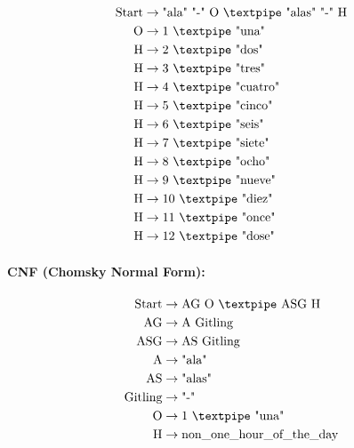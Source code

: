 \begin{equation*}
    \begin{aligned}
        \text{Start}   & \rightarrow \text{"ala" "-" O {\textpipe} "alas" "-" H}   \\
        \text{O} & \rightarrow \text{1 {\textpipe} "una"}   \\
        \text{H} & \rightarrow \text{2 {\textpipe} "dos"} \\
        \text{H} & \rightarrow \text{3 {\textpipe} "tres"} \\
        \text{H} & \rightarrow \text{4 {\textpipe} "cuatro"} \\
        \text{H} & \rightarrow \text{5 {\textpipe} "cinco"} \\
        \text{H} & \rightarrow \text{6 {\textpipe} "seis"} \\
        \text{H} & \rightarrow \text{7 {\textpipe} "siete"} \\
        \text{H} & \rightarrow \text{8 {\textpipe} "ocho"} \\
        \text{H} & \rightarrow \text{9 {\textpipe} "nueve"} \\
        \text{H} & \rightarrow \text{10 {\textpipe} "diez"} \\
        \text{H} & \rightarrow \text{11 {\textpipe} "once"} \\
        \text{H} & \rightarrow \text{12 {\textpipe} "dose"} \\
    \end{aligned}
\end{equation*}

\paragraph{CNF (Chomsky Normal Form):}

\begin{equation*}
    \begin{aligned}
        \text{Start}   & \rightarrow \text{AG O {\textpipe} ASG H} \\
        \text{AG}      & \rightarrow \text{A Gitling}\\
        \text{ASG}      & \rightarrow \text{AS Gitling}\\
        \text{A}    & \rightarrow \text{"ala"}\\
        \text{AS}    & \rightarrow \text{"alas"}\\
        \text{Gitling} & \rightarrow \text{"-"}\\
        \text{O}   & \rightarrow \text{1 {\textpipe} "una"}\\
        \text{H}   & \rightarrow \text{non\_one\_hour\_of\_the\_day}
    \end{aligned}
\end{equation*}

